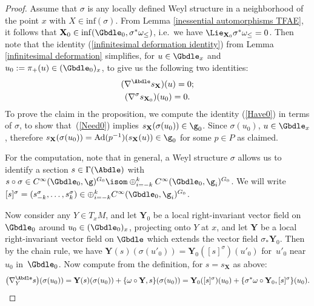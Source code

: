 \begin{proof} Assume that $\sigma$ is any locally def\/ined Weyl structure in a neighborhood of the point $x$ with $X \in \mathrm{inf}(\sigma)$. From Lemma \ref{inessential automorphisms TFAE}, it follows that $\mathbf{X}_0 \in \mathrm{inf}(\Gbdle_0,\sigma^*\omega_{\leq})$, i.e.\ we have $\Lie_{\mathbf{X}_0} \sigma^*\omega_{\leq} = 0$. Then note that the identity (\ref{infinitesimal deformation identity}) from Lemma \ref{infinitesimal deformation} simplif\/ies, for $u \in \Gbdle_x$ and $u_0 := \pi_+(u) \in (\Gbdle_0)_x$, to give us the following two identities:
\begin{gather}
(\nabla^{\Abdle} s_{\mathbf{X}})(u) = 0; \label{Have0} \\
(\nabla^{\sigma} s_{\mathbf{X}_0})(u_0) = 0. \label{Need0}
\end{gather}
 To prove the claim in the proposition, we compute the identity (\ref{Have0}) in terms of $\sigma$, to show that~(\ref{Need0}) implies $s_{\mathbf{X}}(\sigma(u_0)) \in \g_0$. Since $\sigma(u_0)$, $u \in \Gbdle_x$, therefore $s_{\mathbf{X}}(\sigma(u_0)) = \mathrm{Ad}(p^{-1})(s_{\mathbf{X}}(u)) \in \g_0$ for some $p \in P$ as claimed.

 For the computation, note that in general, a Weyl structure $\sigma$ allows us to identify a section $s \in \Gamma(\Abdle)$ with $s \circ \sigma \in C^{\infty}(\Gbdle_0,\g)^{G_0} \isom \oplus_{i=-k}^k C^{\infty}(\Gbdle_0,\g_i)^{G_0}$. We will write $[s]^{\sigma} = (s^{\sigma}_{-k}, \ldots , s^{\sigma}_k) \in \oplus_{i=-k}^k C^{\infty}(\Gbdle_0,\g_i)^{G_0}$.

  Now consider any $Y \in T_xM$, and let $\mathbf{Y}_0$ be a local right-invariant vector f\/ield on $\Gbdle_0$ around $u_0 \in (\Gbdle_0)_x$, projecting onto $Y$ at $x$, and let $\mathbf{Y}$ be a local right-invariant vector f\/ield on $\Gbdle$ which extends the vector f\/ield $\sigma_* \mathbf{Y}_0$. Then by the chain rule, we have $\mathbf{Y}(s)(\sigma(u'_0)) = \mathbf{Y}_0([s]^{\sigma})(u'_0)$ for~$u'_0$ near~$u_0$ in~$\Gbdle_0$. Now compute from the def\/inition, for $s = s_{\mathbf{X}}$ as above:
\begin{gather*}
\big(\nabla^{\Abdle}_Y s\big)(\sigma(u_0))  = \mathbf{Y}(s)(\sigma(u_0)) + \{\omega \circ \mathbf{Y},s\}(\sigma(u_0))
  = \mathbf{Y}_0([s]^{\sigma})(u_0) + \{\sigma^*\omega \circ \mathbf{Y}_0,[s]^{\sigma}\}(u_0).
\end{gather*}


\end{proof}
